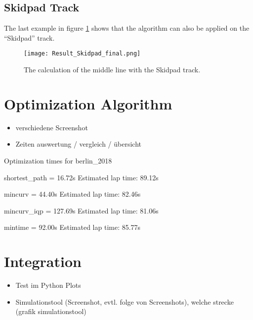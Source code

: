 \subsection{Skidpad Track} \label{sec:Results Skidpad Track}
The last example in figure \ref{fig:Result Skidpad Final} shows that the algorithm can also be applied on the ``Skidpad'' track.
\begin{figure}[H]
    \centering
    \texttt{[image: Result\_Skidpad\_final.png]}
    \caption{The calculation of the middle line with the Skidpad track.}
    \label{fig:Result Skidpad Final}
\end{figure}

\section{Optimization Algorithm}
\begin{itemize}
    \item verschiedene Screenshot
    \item Zeiten auswertung / vergleich / übersicht
\end{itemize}
Optimization times for berlin\_2018

shortest\_path = 16.72s
Estimated lap time: 89.12s

mincurv = 44.40s
Estimated lap time: 82.46s

mincurv\_iqp = 127.69s
Estimated lap time: 81.06s

mintime = 92.00s
Estimated lap time: 85.77s

\section{Integration}
\begin{itemize}
    \item Test im Python Plots
    \item Simulationstool (Screenshot, evtl. folge von Screenshots), welche strecke (grafik simulationstool)
\end{itemize}

